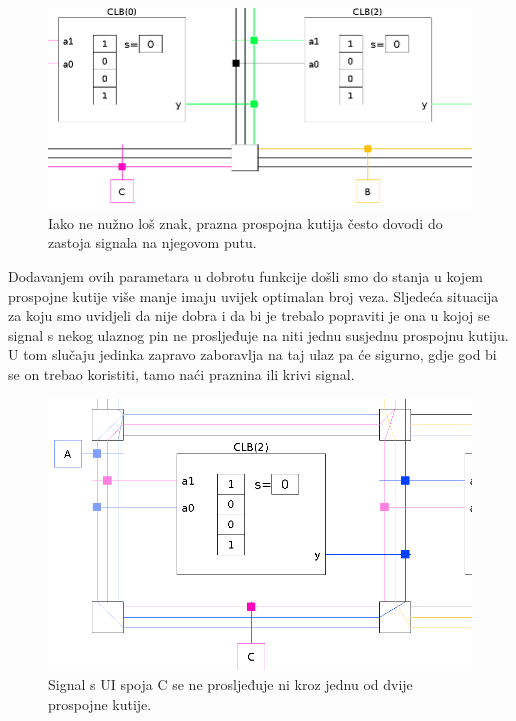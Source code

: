 \documentclass[times, utf8, zavrsni]{fer}
\begin{document}
	
	\begin{figure}[H]
		\centering
		\includegraphics[width=18cm]{slike/isjecakPraznog.png}
		\caption{Iako ne nužno loš znak, prazna prospojna kutija često dovodi do zastoja signala na njegovom putu.}
		\label{fig:prazna-skatula-isjecak}
	\end{figure} 
	
	Dodavanjem ovih parametara u dobrotu funkcije došli smo do stanja u kojem prospojne kutije više manje imaju uvijek optimalan broj veza. Sljedeća situacija za koju smo uvidjeli da nije dobra i da bi je trebalo popraviti je ona u kojoj se signal s nekog ulaznog pin ne prosljeđuje na niti jednu susjednu prospojnu kutiju. U tom slučaju jedinka zapravo zaboravlja na taj ulaz pa će sigurno, gdje god bi se on trebao koristiti, tamo naći praznina ili krivi signal. 
	
	\begin{figure}[H]
		\centering
		\includegraphics[width=18cm]{slike/isjecakCNikamo.png}
		\caption{Signal s UI spoja C se ne prosljeđuje ni kroz jednu od dvije prospojne kutije. }
		\label{fig:isjecak-c-nikamo}
	\end{figure} 
	
\end{document}
